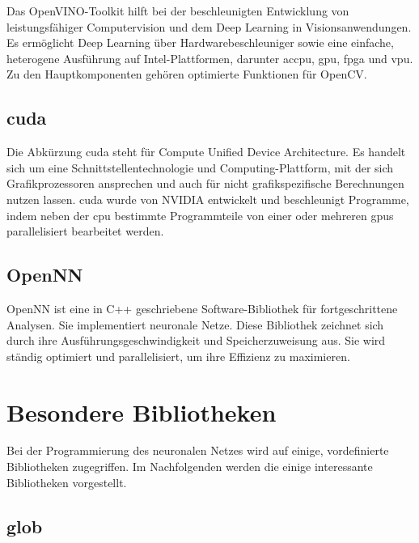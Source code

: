 Das OpenVINO-Toolkit hilft bei der beschleunigten Entwicklung von leistungsfähiger Computervision und dem Deep Learning in Visionsanwendungen. Es ermöglicht Deep Learning über Hardwarebeschleuniger sowie eine einfache, heterogene Ausführung auf Intel-Plattformen, darunter ac{cpu}, \ac{gpu}, \ac{fpga} und \ac{vpu}. Zu den Hauptkomponenten gehören optimierte Funktionen für OpenCV.
\cite{IntelRequirements:2019,OpenVino:2020}

\subsection{\ac{cuda}}



Die Abkürzung \ac{cuda} steht für Compute Unified Device Architecture. Es handelt sich um eine Schnittstellentechnologie und Computing-Plattform, mit der sich Grafikprozessoren ansprechen und auch für nicht grafikspezifische Berechnungen nutzen lassen. \ac{cuda} wurde von NVIDIA entwickelt und beschleunigt Programme, indem neben der \ac{cpu} bestimmte Programmteile von einer oder mehreren \ac{gpu}s parallelisiert bearbeitet werden. \cite{Tan:2019,CUDA:2020,CUDATK:2020} 

\subsection{OpenNN}

OpenNN ist eine in C++ geschriebene Software-Bibliothek für fortgeschrittene Analysen. Sie implementiert neuronale Netze.
Diese Bibliothek zeichnet sich durch ihre Ausführungsgeschwindigkeit und Speicherzuweisung aus. Sie wird ständig optimiert und parallelisiert, um ihre Effizienz zu maximieren. \cite{OpenNN:2020}
	




\section{Besondere Bibliotheken}

Bei der Programmierung des neuronalen Netzes wird auf einige, vordefinierte Bibliotheken 
zugegriffen. Im Nachfolgenden werden die einige interessante Bibliotheken vorgestellt.

\subsection{glob}

